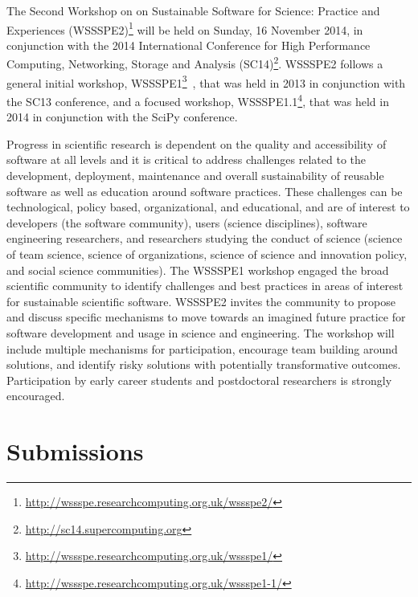 \documentclass[11pt, oneside]{amsart}
\newcommand{\katznote}[1]{ {\textcolor{magenta}    { ***Dan:      #1 }}}
\newcommand{\gabnote}[1]{ {\textcolor{cyan}    { ***Gabrielle:     #1 }}}
\newcommand{\nchnote}[1]{  {\textcolor{orange}      { ***Neil: #1 }}}
\newcommand{\manishnote}[1]{  {\textcolor{violet}     { ***Manish: #1 }}}
\newcommand{\davidnote}[1]{  {\textcolor{darkgreen}      { ***David: #1 }}}
\begin{document}
%
%
%
%

The Second Workshop on on Sustainable Software for Science: Practice and Experiences (WSSSPE2)\footnote{\url{http://wssspe.researchcomputing.org.uk/wssspe2/}} will be held on Sunday, 16 November 2014, in conjunction with the 2014 International Conference for High Performance Computing, Networking, Storage and Analysis (SC14)\footnote{\url{http://sc14.supercomputing.org}}.
WSSSPE2 follows a general initial workshop, WSSSPE1\footnote{\url{http://wssspe.researchcomputing.org.uk/wssspe1/}}~\cite{WSSSPE1-pre-report,WSSSPE1}, that was held in 2013 in conjunction with the SC13 conference, and a focused workshop, WSSSPE1.1\footnote{\url{http://wssspe.researchcomputing.org.uk/wssspe1-1/}}, that was held in 2014 in conjunction with the SciPy conference.

Progress in scientific research is dependent on the quality and accessibility of software at all levels and it is critical to address challenges related to the development, deployment, maintenance and overall sustainability of reusable software as well as education around software practices. These challenges can be technological, policy based, organizational, and educational, and are of interest to developers (the software community), users (science disciplines), software engineering researchers, and researchers studying the conduct of science (science of team science, science of organizations, science of science and innovation policy, and social science communities). The WSSSPE1 workshop engaged the broad scientific community to identify challenges and best practices in areas of interest for sustainable scientific software. WSSSPE2 invites the community to propose and discuss specific mechanisms to move towards an imagined future practice for software development and usage in science and engineering. The workshop will include multiple mechanisms for participation, encourage team building around solutions, and identify risky solutions with potentially transformative outcomes. Participation by early career students and postdoctoral researchers is strongly encouraged.



\section{Submissions}
\end{document}
